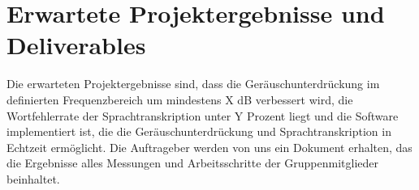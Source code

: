 \documentclass{article}
\begin{document}
\section{Erwartete Projektergebnisse und Deliverables}
Die erwarteten Projektergebnisse sind, dass die Geräuschunterdrückung im definierten Frequenzbereich um mindestens X dB verbessert wird, die Wortfehlerrate der Sprachtranskription unter Y Prozent liegt und die Software implementiert ist, die die Geräuschunterdrückung und Sprachtranskription in Echtzeit ermöglicht.
Die Auftrageber werden von uns ein Dokument erhalten, das die Ergebnisse alles Messungen und Arbeitsschritte der Gruppenmitglieder beinhaltet. 
\end{document}
